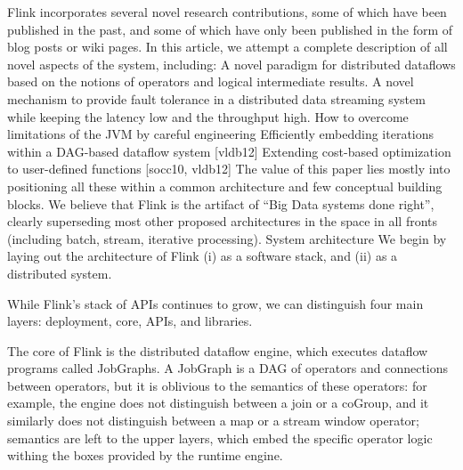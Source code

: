 \documentclass{sig-alternate}
\begin{document}
Flink incorporates several novel research contributions, some of which have been published in the past, and some of which have only been published in the form of blog posts or wiki pages. In this article, we attempt a complete description of all novel aspects of the system, including:
A novel paradigm for distributed dataflows based on the notions of operators and logical intermediate results.
A novel mechanism to provide fault tolerance in a distributed data streaming system while keeping the latency low and the throughput high.
How to overcome limitations of the JVM by careful engineering
Efficiently embedding iterations within a DAG-based dataflow system [vldb12]
Extending cost-based optimization to user-defined functions [socc10, vldb12]
The value of this paper lies mostly into positioning all these within a common architecture and few conceptual building blocks. We believe that Flink is the artifact of “Big Data systems done right”, clearly superseding most other proposed architectures in the space in all fronts (including batch, stream, iterative processing).
System architecture
We begin by laying out the architecture of Flink (i) as a software stack, and (ii) as a distributed system.

While Flink’s stack of APIs continues to grow, we can distinguish four main layers: deployment, core, APIs, and libraries.



The core of Flink is the distributed dataflow engine, which executes dataflow programs called JobGraphs. A JobGraph is a DAG of operators and connections between operators, but it is oblivious to the semantics of these operators: for example, the engine does not distinguish between a join or a coGroup, and it similarly does not distinguish between a map or a stream window operator; semantics are left to the upper layers, which embed the specific operator logic withing the boxes provided by the runtime engine.
\end{document}
